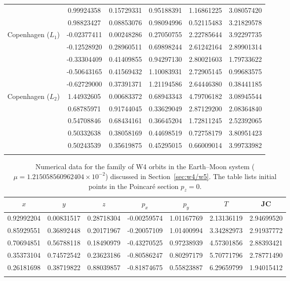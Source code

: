 \documentclass[pdflatex,sn-mathphys-ay]{sn-jnl}%
\theoremstyle{thmstyleone}%
\theoremstyle{thmstyletwo}%
\theoremstyle{thmstylethree}%
\begin{document}
\begin{table}[!h]
\begin{tabular}{cccccc}
 & 0.99924358 & 0.15729331 & 0.95188391 & 1.16861225 & 3.08057420 \\
 & 0.98823427 & 0.08853076 & 0.98094996 & 0.52115483 & 3.21829578 \\
\midrule
Copenhagen ($L_1$) & -0.02377411 & 0.00248286 & 0.27050755 & 2.22785644 & 3.92297735 \\
 & -0.12528920 & 0.28960511 & 0.69898244 & 2.61242164 & 2.89901314 \\
 & -0.33304409 & 0.41409855 & 0.94297130 & 2.80021603 & 1.79733622 \\
 & -0.50643165 & 0.41569432 & 1.10083931 & 2.72905145 & 0.99683575 \\
 & -0.62729000 & 0.37391371 & 1.21194586 & 2.64446380 & 0.38441185 \\
\midrule
Copenhagen ($L_2$) & 1.44932605 & 0.00683372 & 0.68943343 & 4.79706182 & 3.08945544 \\
 & 0.68785971 & 0.91744045 & 0.33629049 & 2.87129200 & 2.08364840 \\
 & 0.54708846 & 0.68434161 & 0.36645204 & 1.72811245 & 2.52392065 \\
 & 0.50332638 & 0.38058169 & 0.44698519 & 0.72758179 & 3.80951423 \\
 & 0.50243539 & 0.35619875 & 0.45295015 & 0.66009014 & 3.99733982 \\
\botrule
\end{tabular}
\end{table}

\begin{table}[!h]
\centering
\caption{
Numerical data for the family of W4 orbits in the Earth--Moon system ($\mu=1.215058560962404 \times 10^{-2}$) discussed in Section~\ref{sec:w4/w5}.
The table lists initial points in the Poincar\'e section $p_z = 0$.
}
\scriptsize
\label{tbl:data-W4}
\begin{tabular}{ccccccc}
\toprule
$x$ & $y$ & $z$ & $p_x$ & $p_y$ & $T$ & JC \\ 
\midrule
\midrule
0.92992204 & 0.00831517 & 0.28718304 & -0.00259574 & 1.01167769 & 2.13136119 & 2.94699520 \\
0.85929551 & 0.36892448 & 0.20171967 & -0.20057109 & 1.01400994 & 3.34282973 & 2.91937772 \\
0.70694851 & 0.56788118 & 0.18490979 & -0.43270525 & 0.97238939 & 4.57301856 & 2.88393421 \\
0.35373104 & 0.74572542 & 0.23623186 & -0.80586247 & 0.80297179 & 5.70771796 & 2.78771490 \\
0.26181698 & 0.38719822 & 0.88039857 & -0.81874675 & 0.55823887 & 6.29659799 & 1.94015412 \\
\botrule
\end{tabular}
\end{table}
\end{document}
